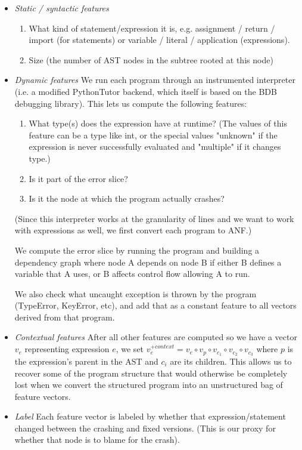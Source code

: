 \documentclass[conference]{IEEEtran}
\begin{document}
\begin{itemize}

\item \emph{Static / syntactic features}
\begin{enumerate}
    \item What kind of statement/expression it is, e.g. assignment / return
     / import (for statements) or variable / literal / application (expressions).
    \item Size (the number of AST nodes in the subtree rooted at this node)
\end{enumerate}

\item \emph{Dynamic features}
We run each program through an instrumented interpreter (i.e. a modified PythonTutor
backend, which itself is based on the BDB debugging library). This lets us
compute the following features:
\begin{enumerate}
    \item What type(s) does the expression have at runtime? (The values of this feature
    can be a type like int, or the special values "unknown" if the expression is
    never successfully evaluated and "multiple" if it changes type.)
    \item Is it part of the error slice?
    \item Is it the node at which the program actually crashes?
\end{enumerate}
(Since this interpreter works at the granularity of lines and we want to work with
expressions as well, we first convert each program to ANF.)

We compute the error slice by running the program and building a dependency
graph where node A depends on node B if either B defines a variable that A uses,
or B affects control flow allowing A to run.

We also check what uncaught exception is thrown by the program (TypeError,
KeyError, etc), and add that as a constant feature to all vectors derived from that program.

\item \emph{Contextual features} After all other features are computed so we have a
vector $v_e$ representing expression $e$, we set $v_e^{+context} = v_e \circ
v_p \circ v_{c_1} \circ v_{c_2} \circ v_{c_3}$ where $p$ is the expression's parent
in the AST and $c_i$ are its children. This allows us to recover some of the
program structure that would otherwise be completely lost when we convert the
structured program into an unstructured bag of feature vectors.

\item \emph{Label} Each feature vector is labeled by whether that expression/statement
changed between the crashing and fixed versions. (This is our proxy for whether
that node is to blame for the crash).

\end{itemize}
\end{document}
